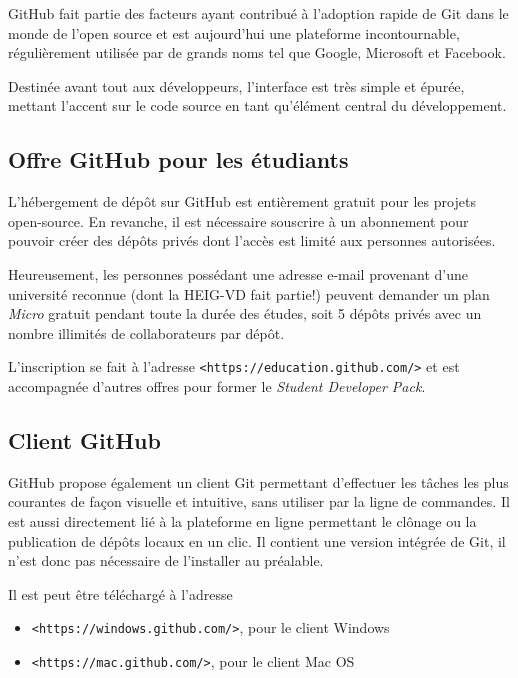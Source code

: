 \documentclass[11pt,a4paper]{article}
\begin{document}
GitHub fait partie des facteurs ayant contribué à l'adoption rapide de Git dans le monde de l'open source et est aujourd'hui une plateforme incontournable, régulièrement utilisée par de grands noms tel que Google, Microsoft et Facebook. 

Destinée avant tout aux développeurs, l'interface est très simple et épurée, mettant l'accent sur le code source en tant qu'élément central du développement.

\subsection{Offre GitHub pour les étudiants}

L'hébergement de dépôt sur GitHub est entièrement gratuit pour les projets open-source.
En revanche, il est nécessaire souscrire à un abonnement pour pouvoir créer des dépôts privés dont l'accès est limité aux personnes autorisées.

Heureusement, les personnes possédant une adresse e-mail provenant d'une université reconnue (dont la HEIG-VD fait partie!) peuvent demander un plan \textit{Micro} gratuit pendant toute la durée des études, soit 5 dépôts privés avec un nombre illimités de collaborateurs par dépôt.

L'inscription se fait à l'adresse {\tt <https://education.github.com/>} et est accompagnée d'autres offres pour former le {\it Student Developer Pack}.

\subsection{Client GitHub}

GitHub propose également un client Git permettant d'effectuer les tâches les plus courantes de façon visuelle et intuitive, sans utiliser par la ligne de commandes.
Il est aussi directement lié à la plateforme en ligne permettant le clônage ou la publication de dépôts locaux en un clic.
Il contient une version intégrée de Git, il n'est donc pas nécessaire de l'installer au préalable.

Il est peut être téléchargé à l'adresse

\begin{itemize}
	\item {\tt <https://windows.github.com/>}, pour le client Windows
	\item {\tt <https://mac.github.com/>}, pour le client Mac OS
\end{itemize}
\end{document}
